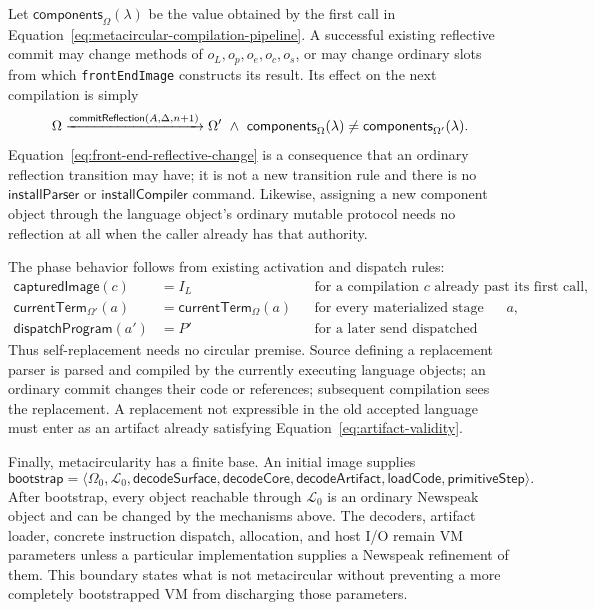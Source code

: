 Let $\mathsf{components}_{\Omega}(\lambda)$ be the value obtained by the first
call in Equation~\eqref{eq:metacircular-compilation-pipeline}.  A successful
existing reflective commit may change methods of $o_L,o_p,o_e,o_c,o_s$, or may
change ordinary slots from which \texttt{frontEndImage} constructs its result.
Its effect on the next compilation is simply
\begin{equation}\label{eq:front-end-reflective-change}
 \Omega\xrightarrow{\mathsf{commitReflection}(A,\Delta,n+1)}\Omega'
 \ \land\
 \mathsf{components}_{\Omega}(\lambda)\ne
 \mathsf{components}_{\Omega'}(\lambda).
\end{equation}
Equation~\eqref{eq:front-end-reflective-change} is a consequence that an
ordinary reflection transition may have; it is not a new transition rule and
there is no $\mathsf{installParser}$ or $\mathsf{installCompiler}$ command.
Likewise, assigning a new component object through the language object's
ordinary mutable protocol needs no reflection at all when the caller already
has that authority.

The phase behavior follows from existing activation and dispatch rules:
\begin{equation}\label{eq:front-end-phase-behavior}
\begin{aligned}
 \mathsf{capturedImage}(c)&=I_L
   &&\text{for a compilation }c\text{ already past its first call},\\
 \mathsf{currentTerm}_{\Omega'}(a)&=\mathsf{currentTerm}_{\Omega}(a)
   &&\text{for every materialized stage activation }a,\\
 \mathsf{dispatchProgram}(a')&=P'
   &&\text{for a later send dispatched after the commit.}
\end{aligned}
\end{equation}
Thus self-replacement needs no circular premise.  Source defining a replacement
parser is parsed and compiled by the currently executing language objects; an
ordinary commit changes their code or references; subsequent compilation sees
the replacement.  A replacement not expressible in the old accepted language
must enter as an artifact already satisfying Equation~\eqref{eq:artifact-validity}.

Finally, metacircularity has a finite base.  An initial image supplies
\begin{equation}\label{eq:bootstrap-basis}
 \mathsf{bootstrap}=\langle
   \Omega_0,\mathcal L_0,
   \mathsf{decodeSurface},\mathsf{decodeCore},\mathsf{decodeArtifact},
   \mathsf{loadCode},\mathsf{primitiveStep}\rangle.
\end{equation}
After bootstrap, every object reachable through $\mathcal L_0$ is an ordinary
Newspeak object and can be changed by the mechanisms above.  The decoders,
artifact loader, concrete instruction dispatch, allocation, and host I/O remain
VM parameters unless a particular implementation supplies a Newspeak
refinement of them.  This boundary states what is not metacircular without
preventing a more completely bootstrapped VM from discharging those parameters.

